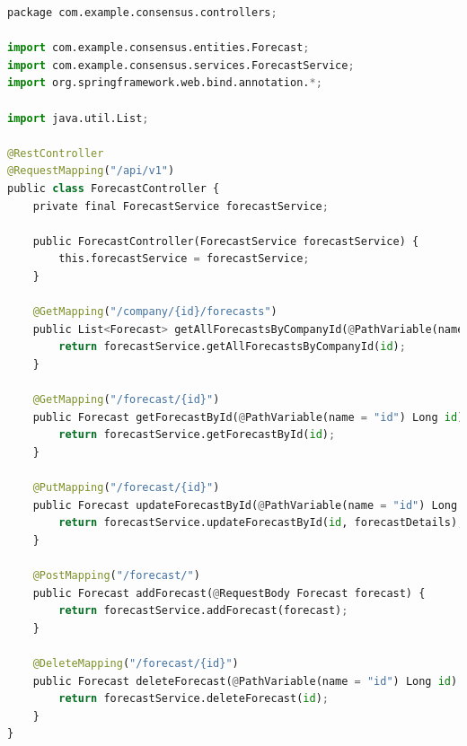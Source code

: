 \begin{lstlisting}[label=lst:control1, caption=Пример реализации взаимодействия клиента с сервером, language=python]
package com.example.consensus.controllers;

import com.example.consensus.entities.Forecast;
import com.example.consensus.services.ForecastService;
import org.springframework.web.bind.annotation.*;

import java.util.List;

@RestController
@RequestMapping("/api/v1")
public class ForecastController {
	private final ForecastService forecastService;

	public ForecastController(ForecastService forecastService) {
		this.forecastService = forecastService;
	}

	@GetMapping("/company/{id}/forecasts")
	public List<Forecast> getAllForecastsByCompanyId(@PathVariable(name="id") Long id) {
		return forecastService.getAllForecastsByCompanyId(id);
	}

	@GetMapping("/forecast/{id}")
	public Forecast getForecastById(@PathVariable(name = "id") Long id) {
		return forecastService.getForecastById(id);
	}

	@PutMapping("/forecast/{id}")
	public Forecast updateForecastById(@PathVariable(name = "id") Long id, @RequestBody Forecast forecastDetails) {
		return forecastService.updateForecastById(id, forecastDetails);
	}

	@PostMapping("/forecast/")
	public Forecast addForecast(@RequestBody Forecast forecast) {
		return forecastService.addForecast(forecast);
	}

	@DeleteMapping("/forecast/{id}")
	public Forecast deleteForecast(@PathVariable(name = "id") Long id) {
		return forecastService.deleteForecast(id);
	}
}
\end{lstlisting}



